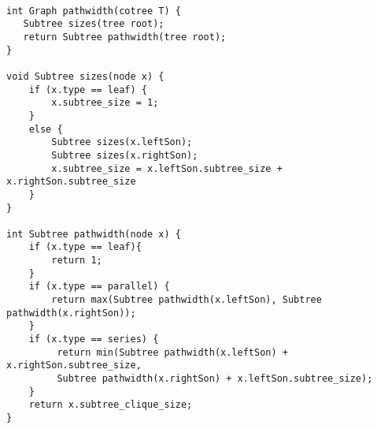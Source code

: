 \begin{verbatim}

int Graph pathwidth(cotree T) {
   Subtree sizes(tree root);
   return Subtree pathwidth(tree root);
}

void Subtree sizes(node x) {
    if (x.type == leaf) {
        x.subtree_size = 1;
    }
    else {
        Subtree sizes(x.leftSon);
        Subtree sizes(x.rightSon);
        x.subtree_size = x.leftSon.subtree_size + x.rightSon.subtree_size
    }
}

int Subtree pathwidth(node x) {
    if (x.type == leaf){
        return 1;
    }
    if (x.type == parallel) {
        return max(Subtree pathwidth(x.leftSon), Subtree pathwidth(x.rightSon));
    }
    if (x.type == series) {
         return min(Subtree pathwidth(x.leftSon) + x.rightSon.subtree_size,
         Subtree pathwidth(x.rightSon) + x.leftSon.subtree_size);
    }
    return x.subtree_clique_size;
}

\end{verbatim}


